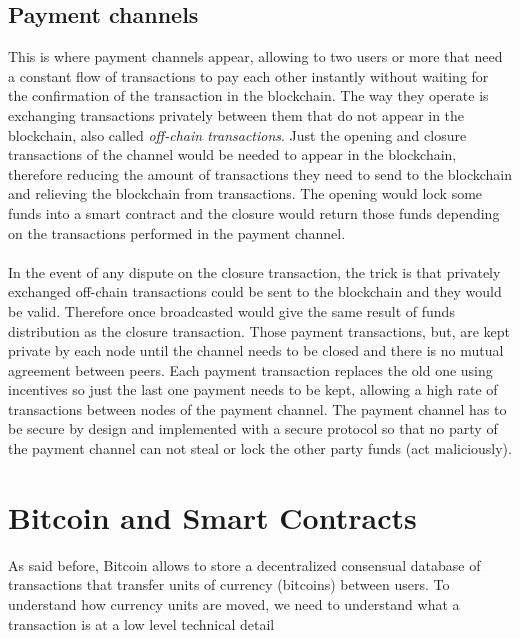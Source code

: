 \documentclass[12pt,journal,compsoc]{IEEEtran}
\begin{document}
\subsection{Payment channels}
This is where payment channels appear\cite{bitcoin-wiki-payment-channels:online}, allowing to two users or more that need a constant flow of transactions to pay each other instantly without waiting for the confirmation of the transaction in the blockchain. The way they operate is exchanging transactions privately between them that do not appear in the blockchain, also called \textit{off-chain transactions}. Just the opening and closure transactions of the channel would be needed to appear in the blockchain, therefore reducing the amount of transactions they need to send to the blockchain and relieving the blockchain from transactions. The opening would lock some funds into a smart contract and the closure would return those funds depending on the transactions performed in the payment channel. \\\\
In the event of any dispute on the closure transaction, the trick is that privately exchanged off-chain transactions could be sent to the blockchain and they would be valid. Therefore once broadcasted would give the same result of funds distribution as the closure transaction. Those payment transactions, but, are kept private by each node until the channel needs to be closed and there is no mutual agreement between peers. Each payment transaction replaces the old one using incentives so just the last one payment needs to be kept, allowing a high rate of transactions between nodes of the payment channel. The payment channel has to be secure by design and implemented with a secure protocol so that no party of the payment channel can not steal or lock the other party funds (act maliciously).

\section{Bitcoin and Smart Contracts}
As said before, Bitcoin allows to store a decentralized consensual database of transactions that transfer units of currency (bitcoins\cite{bitcoin-capitalization:online}) between users. To understand how currency units are moved, we need to understand what a transaction is at a low level technical detail
\end{document}
